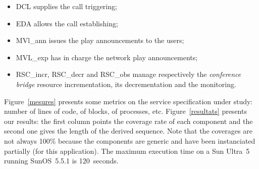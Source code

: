 \begin{itemize}
  \item DCL supplies the call triggering;\vspace*{-1mm}
  \item EDA allows the call establishing;\vspace*{-1mm}
  \item MVl\_ann issues the play announcements to the users;\vspace*{-1mm}
  \item MVL\_exp has in charge the network play announcements;\vspace*{-1mm}
  \item RSC\_incr, RSC\_decr and RSC\_obs manage respectively the
        \emph{conference bridge} resource incrementation, its
        decrementation and the monitoring.\vspace*{-1mm}
\end{itemize}

Figure~\ref{mesures} presents some metrics on the service
specification under study: number of lines of code, of blocks, of
processes, etc. Figure~\ref{resultats} presents our results: the first
column points the coverage rate of each component and the
second one gives the length of the derived sequence. Note that the
coverages are not always 100\% because the components are generic and
have been instanciated partially (for this application). The maximum
execution time on a Sun Ultra~5 running SunOS~5.5.1 is 120~seconds.

